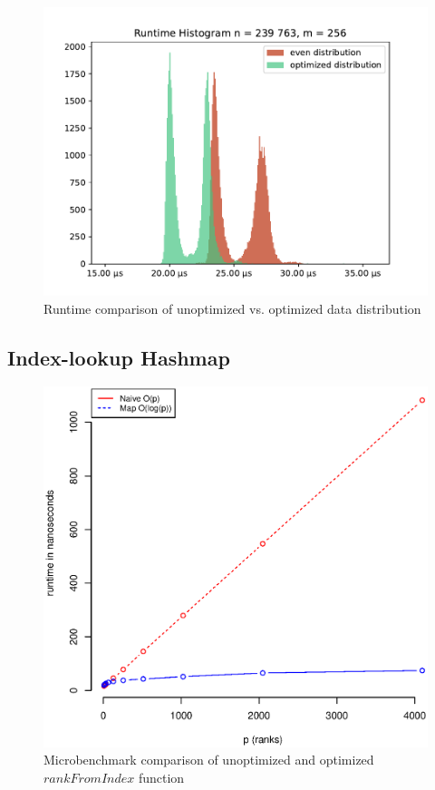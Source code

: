 \begin{figure}
\centering
\includegraphics[scale=0.75]{figures/distribution_experiment}
\caption{Runtime comparison of unoptimized vs. optimized data distribution}
\label{fig:distribution_runtimes}
\end{figure}


\subsection{Index-lookup Hashmap}
\label{sec:IndexLookupHashmap}

\begin{figure}
\centering
\includegraphics[scale=0.55]{figures/microbenchmark_rank_from_index.eps}
\caption{Microbenchmark comparison of unoptimized and optimized $rankFromIndex$ function}
\label{fig:microbenchmarkRankFromIndex}

\end{figure}

